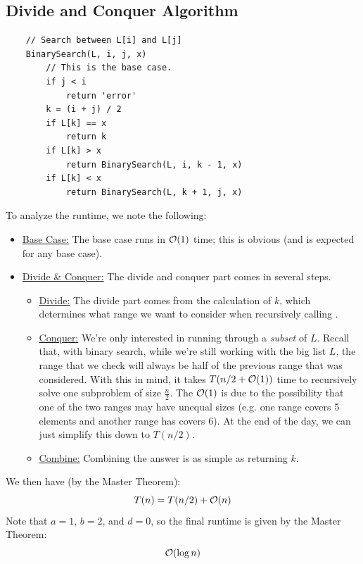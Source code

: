 \documentclass[letterpaper]{article}
\begin{document}
\subsection{Divide and Conquer Algorithm}
\begin{verbatim}
    // Search between L[i] and L[j]
    BinarySearch(L, i, j, x)
        // This is the base case. 
        if j < i
            return 'error'
        k = (i + j) / 2
        if L[k] == x
            return k
        if L[k] > x
            return BinarySearch(L, i, k - 1, x)
        if L[k] < x 
            return BinarySearch(L, k + 1, j, x)
\end{verbatim}
To analyze the runtime, we note the following:
\begin{itemize}
    \item \underline{Base Case:} The base case runs in $\mathcal{O}(1)$ time; this is obvious (and is expected for any base case).
    \item \underline{Divide \& Conquer:} The divide and conquer part comes in several steps. 
    \begin{itemize}
        \item \underline{Divide:} The divide part comes from the calculation of $k$, which determines what range we want to consider when recursively calling .
        \item \underline{Conquer:} We're only interested in running through a \emph{subset} of $L$. Recall that, with binary search, while we're still working with the big list $L$, the range that we check will always be half of the previous range that was considered. With this in mind, it takes $T(n / 2 + \mathcal{O}(1))$ time to recursively solve one subproblem of size $\frac{n}{2}$. The $\mathcal{O}(1)$ is due to the possibility that one of the two ranges may have unequal sizes (e.g. one range covers 5 elements and another range has covers 6). At the end of the day, we can just simplify this down to $T(n / 2)$. 
        \item \underline{Combine:} Combining the answer is as simple as returning $k$. 
    \end{itemize}
\end{itemize}
We then have (by the Master Theorem):
\[T(n) = T(n / 2) + \mathcal{O}(n)\]
Note that $a = 1$, $b = 2$, and $d = 0$, so the final runtime is given by the Master Theorem:
\[\mathcal{O}(\log n)\]
\end{document}

